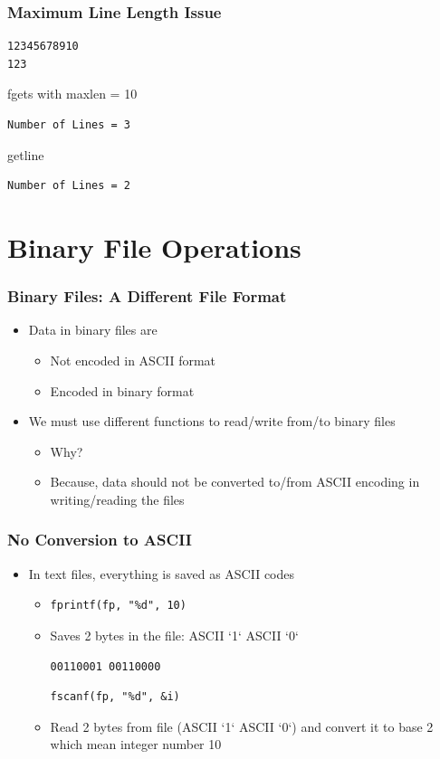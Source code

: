 \documentclass{../c-lecture}
\begin{document}
\begin{frame}[fragile]
  \frametitle{Maximum Line Length Issue}
  \begin{verbatim}
12345678910
123
  \end{verbatim}
  fgets with maxlen = 10
  \begin{verbatim}
Number of Lines = 3
  \end{verbatim}
  getline
  \begin{verbatim}
Number of Lines = 2
  \end{verbatim}
\end{frame}

\section{Binary File Operations}

\begin{frame}
  \frametitle{Binary Files: A Different File Format}
  \begin{itemize}
    \item Data in binary files are
    \begin{itemize}
      \item Not encoded in ASCII format
      \item Encoded in binary format
    \end{itemize}
    \item We must use different functions to read/write from/to binary files
    \begin{itemize}
      \item Why?
      \item
        Because, data should not be converted to/from ASCII encoding in
        writing/reading the files
    \end{itemize}
  \end{itemize}
\end{frame}

\begin{frame}[fragile]
  \frametitle{No Conversion to ASCII}
  \begin{itemize}
    \item In text files, everything is saved as ASCII codes
    \begin{itemize}
      \item[]
      \begin{verbatim}
fprintf(fp, "%d", 10)
      \end{verbatim}
      \item Saves 2 bytes in the file: ASCII `1` ASCII `0`
      \begin{verbatim}
00110001 00110000
      \end{verbatim}
      \begin{verbatim}
fscanf(fp, "%d", &i)
      \end{verbatim}
      \item
        Read 2 bytes from file (ASCII `1` ASCII `0`) and convert it to base 2
        which mean integer number 10
    \end{itemize}
  \end{itemize}
\end{frame}
\end{document}
